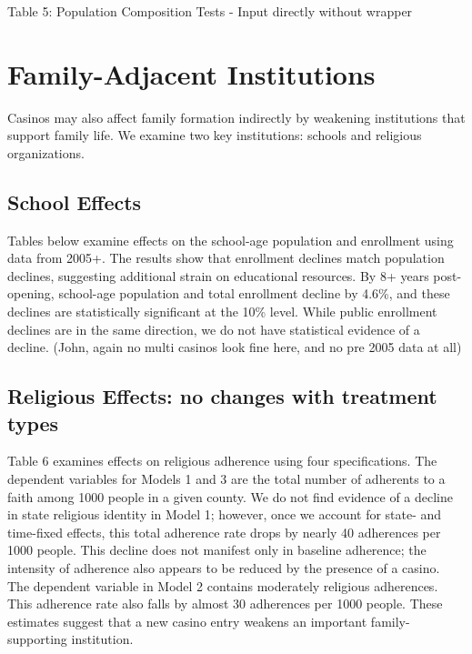 \documentclass[12pt]{article}
\begin{document}
Table 5: Population Composition Tests - Input directly without wrapper






\section{Family-Adjacent Institutions}



Casinos may also affect family formation indirectly by weakening institutions that support family life. We examine two key institutions: schools and religious organizations.

\subsection{School Effects}

Tables below examine effects on the school-age population and enrollment using data from 2005+. The results show that enrollment declines match population declines, suggesting additional strain on educational resources. By 8+ years post-opening, school-age population and total enrollment decline by 4.6\%, and these declines are statistically significant at the 10\% level. While public enrollment declines are in the same direction, we do not have statistical evidence of a decline. (John, again no multi casinos look fine here, and no pre 2005 data at all)







\subsection{Religious Effects: no changes with treatment types}



Table 6 examines effects on religious adherence using four specifications. The dependent variables for Models 1 and 3 are the total number of adherents to a faith among 1000 people in a given county. We do not find evidence of a decline in state religious identity in Model 1; however, once we account for state- and time-fixed effects, this total adherence rate drops by nearly 40 adherences per 1000 people. This decline does not manifest only in baseline adherence; the intensity of adherence also appears to be reduced by the presence of a casino. The dependent variable in Model 2 contains moderately religious adherences. This adherence rate also falls by almost 30 adherences per 1000 people. These estimates suggest that a new casino entry weakens an important family-supporting institution.
\end{document}
